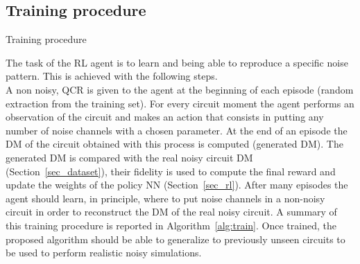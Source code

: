 \documentclass[referee,sn-basic]{sn-jnl} %
\begin{document}
\subsection{Training procedure}\label{sec_training}

\begin{algorithm*}
\caption{Training procedure}\label{alg:train}
\begin{algorithmic}
    \EndFor
\EndFor
\end{algorithmic}
\end{algorithm*}

The task of the RL agent is to learn and being able to reproduce a specific noise pattern. This is achieved with the following steps.\\
A non noisy, QCR is given to the agent at the beginning of each episode (random extraction from the training set). For every circuit moment the agent performs an observation of the circuit and makes an action that consists in putting any number of noise channels with a chosen parameter. At the end of an episode the DM of the circuit obtained with this process is computed (generated DM). The generated DM is compared with the real noisy circuit DM (Section~\ref{sec_dataset}), their fidelity is used to compute the final reward and update the weights of the policy NN (Section~\ref{sec_rl}).
After many episodes the agent should learn, in principle, where to put noise channels in a non-noisy circuit in order to reconstruct the DM of the real noisy circuit. 
A summary of this training procedure is reported in Algorithm~\ref{alg:train}. Once trained, the proposed algorithm should be able to generalize to previously unseen circuits to be used to perform realistic noisy simulations.\\
\end{document}
